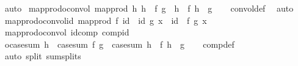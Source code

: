 \begin{isabellebody}
\ auto%
\endisatagproof
{\isafoldproof}%
%
\isadelimproof
\isanewline
%
\endisadelimproof
\isanewline
{}\isamarkupfalse%
\ map{\isacharunderscore}{\kern0pt}prod{\isacharunderscore}{\kern0pt}o{\isacharunderscore}{\kern0pt}convol{\isacharcolon}{\kern0pt}\ {\isachardoublequoteopen}map{\isacharunderscore}{\kern0pt}prod\ h{}\ h{}\ {\isasymcirc}\ {\isasymlangle}f{\isacharcomma}{\kern0pt}\ g{\isasymrangle}\ {\isacharequal}{\kern0pt}\ {\isasymlangle}h{}\ {\isasymcirc}\ f{\isacharcomma}{\kern0pt}\ h{}\ {\isasymcirc}\ g{\isasymrangle}{\isachardoublequoteclose}\isanewline
%
\isadelimproof
\ \ %
\endisadelimproof
%
\isatagproof
{}\isamarkupfalse%
\ convol{\isacharunderscore}{\kern0pt}def\ \isamarkupfalse%
\ auto%
\endisatagproof
{\isafoldproof}%
%
\isadelimproof
\isanewline
%
\endisadelimproof
\isanewline
{}\isamarkupfalse%
\ map{\isacharunderscore}{\kern0pt}prod{\isacharunderscore}{\kern0pt}o{\isacharunderscore}{\kern0pt}convol{\isacharunderscore}{\kern0pt}id{\isacharcolon}{\kern0pt}\ {\isachardoublequoteopen}{\isacharparenleft}{\kern0pt}map{\isacharunderscore}{\kern0pt}prod\ f\ id\ {\isasymcirc}\ {\isasymlangle}id{\isacharcomma}{\kern0pt}\ g{\isasymrangle}{\isacharparenright}{\kern0pt}\ x\ {\isacharequal}{\kern0pt}\ {\isasymlangle}id\ {\isasymcirc}\ f{\isacharcomma}{\kern0pt}\ g{\isasymrangle}\ x{\isachardoublequoteclose}\isanewline
%
\isadelimproof
\ \ %
\endisadelimproof
%
\isatagproof
{}\isamarkupfalse%
\ map{\isacharunderscore}{\kern0pt}prod{\isacharunderscore}{\kern0pt}o{\isacharunderscore}{\kern0pt}convol\ id{\isacharunderscore}{\kern0pt}comp\ comp{\isacharunderscore}{\kern0pt}id\ \isacommand{{\isachardot}{\kern0pt}{\isachardot}{\kern0pt}}\isamarkupfalse%
%
\endisatagproof
{\isafoldproof}%
%
\isadelimproof
\isanewline
%
\endisadelimproof
\isanewline
{}\isamarkupfalse%
\ o{\isacharunderscore}{\kern0pt}case{\isacharunderscore}{\kern0pt}sum{\isacharcolon}{\kern0pt}\ {\isachardoublequoteopen}h\ {\isasymcirc}\ case{\isacharunderscore}{\kern0pt}sum\ f\ g\ {\isacharequal}{\kern0pt}\ case{\isacharunderscore}{\kern0pt}sum\ {\isacharparenleft}{\kern0pt}h\ {\isasymcirc}\ f{\isacharparenright}{\kern0pt}\ {\isacharparenleft}{\kern0pt}h\ {\isasymcirc}\ g{\isacharparenright}{\kern0pt}{\isachardoublequoteclose}\isanewline
%
\isadelimproof
\ \ %
\endisadelimproof
%
\isatagproof
{}\isamarkupfalse%
\ comp{\isacharunderscore}{\kern0pt}def\ \isamarkupfalse%
\ {\isacharparenleft}{\kern0pt}auto\ split{\isacharcolon}{\kern0pt}\ sum{\isachardot}{\kern0pt}splits{\isacharparenright}{\kern0pt}%

\end{isabellebody}
